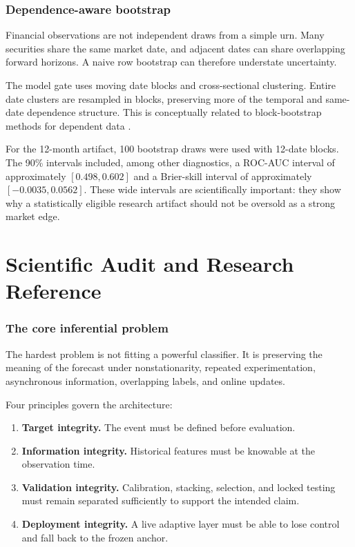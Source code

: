 \documentclass[11pt]{article}
\begin{document}
\section{Dependence-aware bootstrap}

Financial observations are not independent draws from a simple urn. Many securities share the same market date, and adjacent dates can share overlapping forward horizons. A naive row bootstrap can therefore understate uncertainty.

The model gate uses moving date blocks and cross-sectional clustering. Entire date clusters are resampled in blocks, preserving more of the temporal and same-date dependence structure. This is conceptually related to block-bootstrap methods for dependent data \citep{kunsch1989jackknife,politis1994stationary}.

For the 12-month artifact, 100 bootstrap draws were used with 12-date blocks. The 90\% intervals included, among other diagnostics, a ROC-AUC interval of approximately $[0.498,0.602]$ and a Brier-skill interval of approximately $[-0.0035,0.0562]$. These wide intervals are scientifically important: they show why a statistically eligible research artifact should not be oversold as a strong market edge.

\part{Scientific Audit and Research Reference}

\section{The core inferential problem}

The hardest problem is not fitting a powerful classifier. It is preserving the meaning of the forecast under nonstationarity, repeated experimentation, asynchronous information, overlapping labels, and online updates.

Four principles govern the architecture:

\begin{enumerate}
\item \textbf{Target integrity.} The event must be defined before evaluation.
\item \textbf{Information integrity.} Historical features must be knowable at the observation time.
\item \textbf{Validation integrity.} Calibration, stacking, selection, and locked testing must remain separated sufficiently to support the intended claim.
\item \textbf{Deployment integrity.} A live adaptive layer must be able to lose control and fall back to the frozen anchor.
\end{enumerate}
\end{document}
